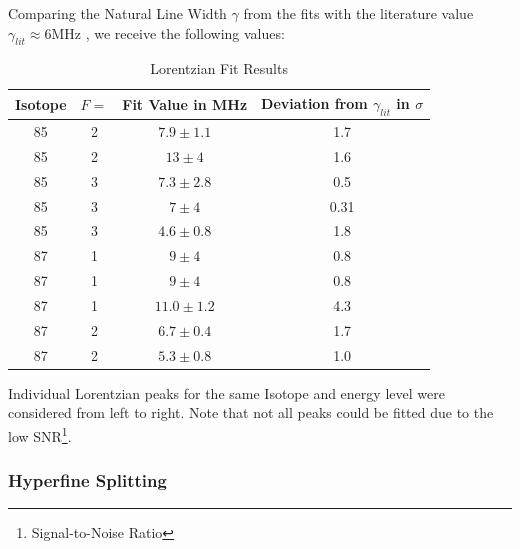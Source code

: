 \documentclass[12pt, a4paper]{article}
\begin{document}
Comparing the Natural Line Width $\gamma$ from the fits with the literature value $\gamma_{lit} \approx 6\si{\mega\hertz}$ \cite{script}, we receive the following values:

\begin{table}[htb]
\begin{center}
\caption{Lorentzian Fit Results}
\vspace{4mm}
\begin{tabular}{|c|c|c|c|}\hline
Isotope         & $F =$          & Fit Value in MHz   & Deviation from $\gamma_{lit}$ in $\sigma$ \\\hline
85              & 2              & $7.9 \pm 1.1$      & 1.7\\
85              & 2              & $13 \pm 4$         & 1.6\\
85              & 3              & $7.3 \pm 2.8$      & 0.5\\
85              & 3              & $7 \pm 4$          & 0.31\\
85              & 3              & $4.6 \pm 0.8$      & 1.8\\
87              & 1              & $9 \pm 4$          & 0.8\\
87              & 1              & $9 \pm 4$          & 0.8\\
87              & 1              & $11.0 \pm 1.2$     & 4.3\\
87              & 2              & $6.7 \pm 0.4$      & 1.7\\
87              & 2              & $5.3 \pm 0.8$      & 1.0\\\hline
\end{tabular}

\end{center}
\end{table}

Individual Lorentzian peaks for the same Isotope and energy level were considered from left to right. Note that not all peaks could be fitted due to the low SNR\footnote{Signal-to-Noise Ratio}.

\subsubsection{Hyperfine Splitting}
\end{document}
